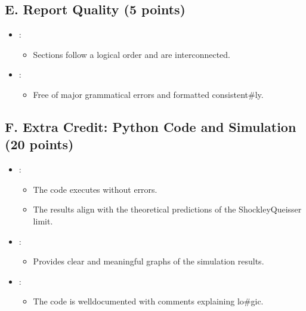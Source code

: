 \documentclass[letterpaper,10pt,english]{jupyterBook}
\begin{document}
\subsection{E. Report Quality (5 points)}
\label{\detokenize{ProjectSyllabus:e-report-quality-5-points}}\begin{itemize}
\item {} 
\sphinxAtStartPar
{}:
\begin{itemize}
\item {} 
\sphinxAtStartPar
Sections follow a logical order and are interconnected.

\end{itemize}

\item {} 
\sphinxAtStartPar
{}:
\begin{itemize}
\item {} 
\sphinxAtStartPar
Free of major grammatical errors and formatted consistent\#ly.

\end{itemize}

\end{itemize}


\subsection{F. Extra Credit: Python Code and Simulation (20 points)}
\label{\detokenize{ProjectSyllabus:f-extra-credit-python-code-and-simulation-20-points}}\begin{itemize}
\item {} 
\sphinxAtStartPar
{}:
\begin{itemize}
\item {} 
\sphinxAtStartPar
The code executes without errors.

\item {} 
\sphinxAtStartPar
The results align with the theoretical predictions of the
Shockley\sphinxhyphen{}Queisser limit.

\end{itemize}

\item {} 
\sphinxAtStartPar
{}:
\begin{itemize}
\item {} 
\sphinxAtStartPar
Provides clear and meaningful graphs of the simulation results.

\end{itemize}

\item {} 
\sphinxAtStartPar
{}:
\begin{itemize}
\item {} 
\sphinxAtStartPar
The code is well\sphinxhyphen{}documented with comments explaining lo\#gic.

\end{itemize}

\end{itemize}
\end{document}
